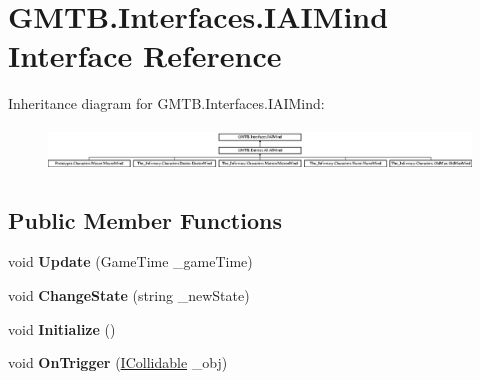 \hypertarget{interface_g_m_t_b_1_1_interfaces_1_1_i_a_i_mind}{}\section{G\+M\+T\+B.\+Interfaces.\+I\+A\+I\+Mind Interface Reference}
\label{interface_g_m_t_b_1_1_interfaces_1_1_i_a_i_mind}
Inheritance diagram for G\+M\+T\+B.\+Interfaces.\+I\+A\+I\+Mind\+:\begin{figure}[H]
\begin{center}
\leavevmode
\includegraphics[height=1.154639cm]{interface_g_m_t_b_1_1_interfaces_1_1_i_a_i_mind}
\end{center}
\end{figure}
\subsection*{Public Member Functions}
\begin{DoxyCompactItemize}
\item 
\mbox{\label{interface_g_m_t_b_1_1_interfaces_1_1_i_a_i_mind_a578a4c68bda988292d630eb955574da3}} 
void {\bfseries Update} (Game\+Time \+\_\+game\+Time)
\item 
\mbox{\label{interface_g_m_t_b_1_1_interfaces_1_1_i_a_i_mind_a90a0d92d852fb1b2a8e7f020c8e160a4}} 
void {\bfseries Change\+State} (string \+\_\+new\+State)
\item 
\mbox{\label{interface_g_m_t_b_1_1_interfaces_1_1_i_a_i_mind_ade47becd09c753421bcc5b02e0cc7991}} 
void {\bfseries Initialize} ()
\item 
\mbox{\label{interface_g_m_t_b_1_1_interfaces_1_1_i_a_i_mind_a2a4d0ae21561793ef156f7dffa151415}} 
void {\bfseries On\+Trigger} (\mbox{\hyperlink{interface_g_m_t_b_1_1_collision_system_1_1_i_collidable}{I\+Collidable}} \+\_\+obj)
\end{DoxyCompactItemize}
